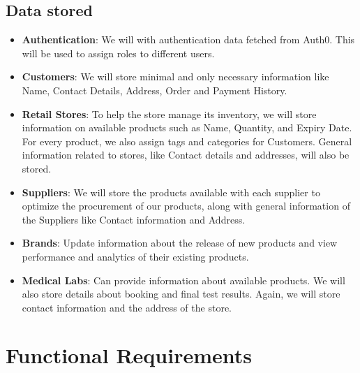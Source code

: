 \documentclass{article}
\begin{document}
\subsection{Data stored}
\begin{itemize}
    \item \textbf{Authentication}: We will with authentication data fetched from Auth0. This will be used to assign roles to different users.
    \item \textbf{Customers}: We will store minimal and only necessary information like Name, Contact Details, Address, Order and Payment History.
    \item \textbf{Retail Stores}: To help the store manage its inventory, we will store information on available products such as Name, Quantity, and Expiry Date. For every product, we also assign tags and categories for Customers. General information related to stores, like Contact details and addresses, will also be stored.
    \item \textbf{Suppliers}: We will store the products available with each supplier to optimize the procurement of our products, along with general information of the Suppliers like Contact information and Address.
    \item \textbf{Brands}: Update information about the release of new products and view performance and analytics of their existing products. 
    \item \textbf{Medical Labs}: Can provide information about available products. We will also store details about booking and final test results. Again, we will store contact information and the address of the store.
\end{itemize}


\section{Functional Requirements}
\end{document}
